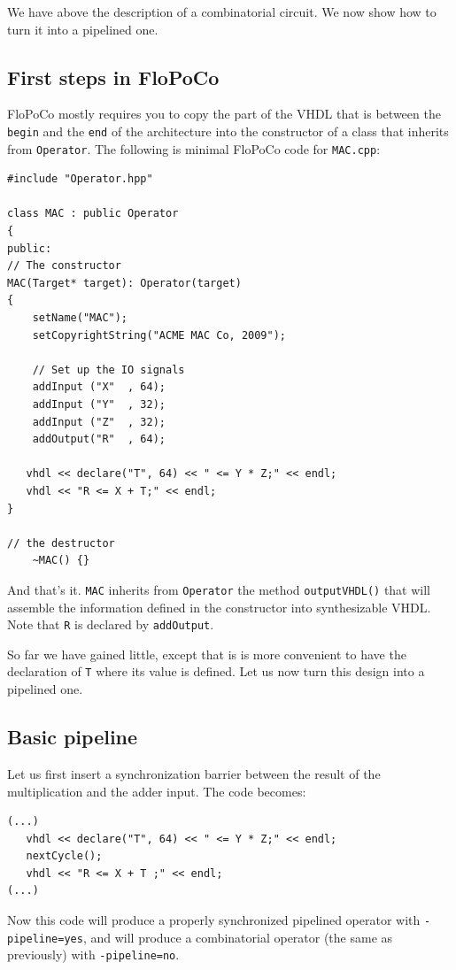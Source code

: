 \documentclass{article}
\begin{document}
We have above  the description of
a combinatorial circuit. We now show how to turn it into a pipelined
one.


\subsection{First steps in FloPoCo}

FloPoCo mostly requires you to copy the part of the VHDL that is
between the \texttt{begin} and the \texttt{end} of the architecture
into the constructor of a class that inherits from
\verb!Operator!. The following is minimal FloPoCo code for
\verb!MAC.cpp!:
\begin{verbatim}
#include "Operator.hpp"

class MAC : public Operator
{
public:
// The constructor
MAC(Target* target): Operator(target)
{
	setName("MAC");
	setCopyrightString("ACME MAC Co, 2009");		

	// Set up the IO signals
	addInput ("X"  , 64);
	addInput ("Y"  , 32);
	addInput ("Z"  , 32);
	addOutput("R"  , 64);

   vhdl << declare("T", 64) << " <= Y * Z;" << endl;
   vhdl << "R <= X + T;" << endl;
}

// the destructor
	~MAC() {}
\end{verbatim}
 
And that's it. \verb!MAC! inherits from \verb!Operator! the method
\verb!outputVHDL()! that will assemble the information defined in the
constructor into synthesizable VHDL. Note that \verb!R! is declared by \verb!addOutput!.

So far we have gained little, except that is is more convenient to
have the declaration of \verb!T! where its value is defined. Let us
now turn this design into a pipelined one.


\subsection{Basic pipeline}


Let us first insert a synchronization barrier between the result of the multiplication and the adder input. The code becomes: 

\begin{verbatim}
(...)
   vhdl << declare("T", 64) << " <= Y * Z;" << endl;
   nextCycle();
   vhdl << "R <= X + T ;" << endl;
(...)
\end{verbatim}

Now this code will produce a properly synchronized pipelined operator
with \verb!-pipeline=yes!, and will produce a combinatorial operator
(the same as previously) with \verb!-pipeline=no!.
\end{document}
